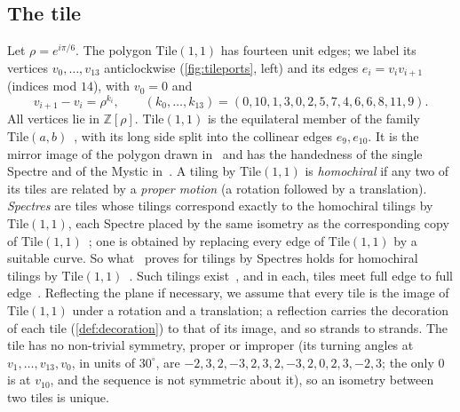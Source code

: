\documentclass[11pt]{amsart}
\theoremstyle{definition}
\theoremstyle{remark}
\newcommand{\Tile}{\mathrm{Tile}(1,1)}
\newcommand{\ZZ}{\mathbb Z}
\begin{document}
\subsection{The tile}\label{sec:tile}
Let $\rho=e^{i\pi/6}$. The polygon $\Tile$ has fourteen unit edges; we label its vertices $v_0,\dots,v_{13}$
anticlockwise (\cref{fig:tileports}, left) and its edges $e_i=v_iv_{i+1}$ (indices mod $14$), with $v_0=0$ and
\[
v_{i+1}-v_i=\rho^{k_i},\qquad (k_0,\dots,k_{13})=(0,10,1,3,0,2,5,7,4,6,6,8,11,9).
\]
All vertices lie in $\ZZ[\rho]$. $\Tile$ is the equilateral member of the family $\mathrm{Tile}(a,b)$~\cite[\S\S1--2]{SMKGS-spectre},
with its long side split into the collinear edges $e_9,e_{10}$. It is the mirror image of the polygon drawn
in~\cite[Fig.~1.1]{SMKGS-spectre} and has the handedness of the single Spectre and of the Mystic
in~\cite[Fig.~2.1]{SMKGS-spectre}. A tiling by $\Tile$ is \emph{homochiral} if any two of its tiles are related by a
\emph{proper motion} (a rotation followed by a translation). \emph{Spectres} are tiles whose tilings correspond exactly
to the homochiral tilings by $\Tile$, each Spectre placed by the same isometry as the corresponding copy of
$\Tile$~\cite[\S2, Lemma~2.1]{SMKGS-spectre}; one is obtained by replacing every edge of $\Tile$ by a suitable curve. So
what~\cite{SMKGS-spectre} proves for tilings by Spectres holds for homochiral tilings by $\Tile$~\cite[p.~5]{SMKGS-spectre}.
Such tilings exist~\cite[Thm.~2.2]{SMKGS-spectre}, and in each, tiles meet full edge to full edge~\cite[proof of
Lemma~2.1]{SMKGS-spectre}. Reflecting the plane if necessary, we assume that every tile is the image of $\Tile$ under a
rotation and a translation; a reflection carries the decoration of each tile (\cref{def:decoration}) to that of its
image, and so strands to strands. The tile has no non-trivial symmetry, proper or improper (its turning angles at
$v_1,\dots,v_{13},v_0$, in units of $30^\circ$, are $-2,3,2,-3,2,3,2,-3,2,0,2,3,-2,3$; the only $0$ is at $v_{10}$, and
the sequence is not symmetric about it), so an isometry between two tiles is unique.
\end{document}
